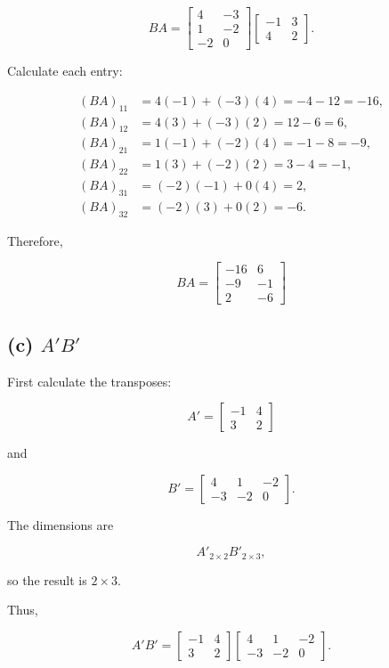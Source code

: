 \documentclass[12pt]{article}
\begin{document}
\[
BA=
\begin{bmatrix}
4 & -3\\
1 & -2\\
-2 & 0
\end{bmatrix}
\begin{bmatrix}
-1 & 3\\
4 & 2
\end{bmatrix}.
\]

Calculate each entry:

\[
\begin{aligned}
(BA)_{11}
&=4(-1)+(-3)(4)
=-4-12
=-16,\\
(BA)_{12}
&=4(3)+(-3)(2)
=12-6
=6,\\
(BA)_{21}
&=1(-1)+(-2)(4)
=-1-8
=-9,\\
(BA)_{22}
&=1(3)+(-2)(2)
=3-4
=-1,\\
(BA)_{31}
&=(-2)(-1)+0(4)
=2,\\
(BA)_{32}
&=(-2)(3)+0(2)
=-6.
\end{aligned}
\]

Therefore,

\[
\boxed{
BA=
\begin{bmatrix}
-16 & 6\\
-9 & -1\\
2 & -6
\end{bmatrix}}
\]

\subsection*{(c) $A'B'$}

First calculate the transposes:

\[
A'=
\begin{bmatrix}
-1 & 4\\
3 & 2
\end{bmatrix}
\]

and

\[
B'=
\begin{bmatrix}
4 & 1 & -2\\
-3 & -2 & 0
\end{bmatrix}.
\]

The dimensions are

\[
A'_{2\times2}B'_{2\times3},
\]

so the result is $2\times3$.

Thus,

\[
A'B'
=
\begin{bmatrix}
-1 & 4\\
3 & 2
\end{bmatrix}
\begin{bmatrix}
4 & 1 & -2\\
-3 & -2 & 0
\end{bmatrix}.
\]
\end{document}
